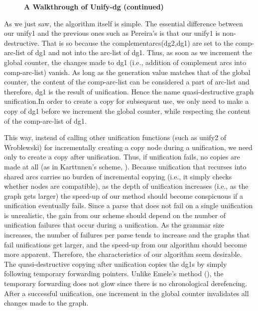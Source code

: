 \begin{figure}[htb] 
\hspace{-1cm}
\caption{{\bf A Walkthrough of Unify-dg (continued)}}
\label{figure3}
\end{figure}


As we just saw, the algorithm itself is simple.  
The essential difference between our unify1 and the previous ones
such as Pereira's is that our unify1 is non-destructive.  That is so 
because the complementarcs(dg2,dg1) are set to the comp-arc-list of
dg1 and not into the arc-list of dg1.  Thus, as soon as we increment
the global counter, the changes made to dg1 (i.e., addition of
complement arcs into comp-arc-list) vanish.  As long as the
generation value matches that of the global counter, the content of
the comp-arc-list can be considered a part of arc-list and therefore,
dg1 is the result of unification.  Hence the name quasi-destructive
graph unification.\clearpage  \hspace{-0.5cm}In order to create a copy for subsequent use, we
only need to make a copy of dg1 before we increment the global counter,
while respecting the content of the comp-arc-list of dg1. 

This way, instead of calling other unification functions (such as
unify2 of Wroblewski) for incrementally creating a copy node during a
unification, we need only to create a copy after unification.  Thus,
if unification fails, no copies are made at all (as in Karttunen's
scheme, \cite{reversible}).  Because unification that recurses into
shared arcs carries no burden of incremental copying (i.e., it simply
checks whether nodes are compatible), as the depth of unification
increases (i.e., as the graph gets larger) the speed-up of our method
should become conspicuous if a unification eventually fails.  Since a
parse that does not fail on a single unification is unrealistic, the
gain from our scheme should depend on the number of unification
failures that occur during a unification.  As the grammar size
increases, the number of failures per parse tends to increase and the
graphs that fail unifications get larger, and the speed-up from our algorithm
should become more apparent. Therefore, the characteristics of our
algorithm seem desirable.
The quasi-destructive copying after unification copies the dg1s
by simply following temporary forwarding pointers. Unlike Emele's
method (\cite{Emele}), the temporary forwarding does not glow since there is no
chronological derefencing. After a successful unification, one
increment in the global counter invalidates all changes made to the
graph. 

